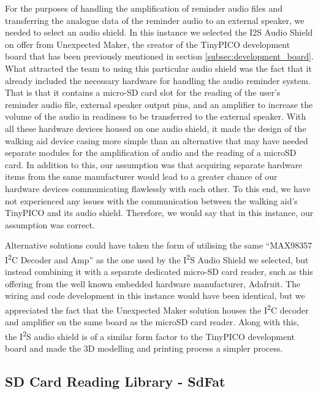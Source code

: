             For the purposes of handling the amplification of reminder audio files and transferring the analogue data of the reminder audio to an external speaker, we needed to select an audio shield. In this instance we selected the I2S Audio Shield \cite{unexpected_maker} on offer from Unexpected Maker, the creator of the TinyPICO development board that has been previously mentioned in section \ref{subsec:development_board}. What attracted the team to using this particular audio shield was the fact that it already included the necessary hardware for handling the audio reminder system. That is that it contains a micro-SD card slot for the reading of the user's reminder audio file, external speaker output pins, and an amplifier to increase the volume of the audio in readiness to be transferred to the external speaker. With all these hardware devices housed on one audio shield, it made the design of the walking aid device casing more simple than an alternative that may have needed separate modules for the amplification of audio and the reading of a microSD card. In addition to this, our assumption was that acquiring separate hardware items from the same manufacturer would lead to a greater chance of our hardware devices communicating flawlessly with each other. To this end, we have not experienced any issues with the communication between the walking aid's TinyPICO and its audio shield. Therefore, we would say that in this instance, our assumption was correct.
            
            Alternative solutions could have taken the form of utilising the same ``MAX98357 I\textsuperscript{2}C Decoder and Amp'' \cite{unexpected_maker} as the one used by the I\textsuperscript{2}S Audio Shield we selected, but instead combining it with a separate dedicated micro-SD card reader, such as this offering \cite{ada_2022} from the well known embedded hardware manufacturer, Adafruit. The wiring and code development in this instance would have been identical, but we appreciated the fact that the Unexpected Maker solution houses the I\textsuperscript{2}C decoder and amplifier on the same board as the microSD card reader. Along with this, the I\textsuperscript{2}S audio shield is of a similar form factor to the TinyPICO development board and made the 3D modelling and printing process a simpler process.

        \subsection{SD Card Reading Library - SdFat}
        \label{subsec:sdfat}

